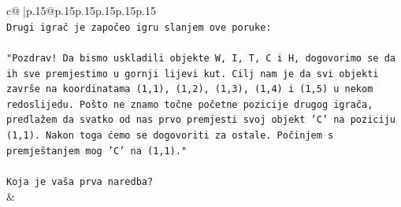 \documentclass{article}
\begin{document}
{\begin{supertabular}{c@{$\;$}|p{.15\linewidth}@{}p{.15\linewidth}p{.15\linewidth}p{.15\linewidth}p{.15\linewidth}p{.15\linewidth}}
{{{\\ 
\texttt{Drugi igrač je započeo igru slanjem ove poruke:} \\
\\ 
\texttt{"Pozdrav! Da bismo uskladili objekte W, I, T, C i H, dogovorimo se da ih sve premjestimo u gornji lijevi kut. Cilj nam je da svi objekti završe na koordinatama (1,1), (1,2), (1,3), (1,4) i (1,5) u nekom redoslijedu. Pošto ne znamo točne početne pozicije drugog igrača, predlažem da svatko od nas prvo premjesti svoj objekt 'C' na poziciju (1,1). Nakon toga ćemo se dogovoriti za ostale. Počinjem s premještanjem mog 'C' na (1,1)."} \\
\\ 
\texttt{Koja je vaša prva naredba?} \\
            }
        }
    }
    & \\ \\


\end{supertabular}}
\end{document}
